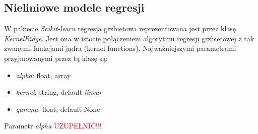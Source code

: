 \subsection{Nieliniowe modele regresji}
W pakiecie \textit{Scikit-learn} regresja grzbietowa reprezentowana jest przez klasę \textit{KernelRidge}.
Jest ona w istocie połączeniem algorytmu regresji grzbietowej z tak zwanymi funkcjami jądra (kernel functions).
Najważniejszymi parametrami przyjmowanymi przez tą klasę są:
\begin{itemize}
 \item \textit{alpha}: {float, array}
 \item \textit{kernel}: string, default \textit{linear}
 \item \textit{gamma}: float, default None
\end{itemize}

Parametr \textit{alpha}
\textcolor{red}{UZUPEŁNIĆ!!!}
